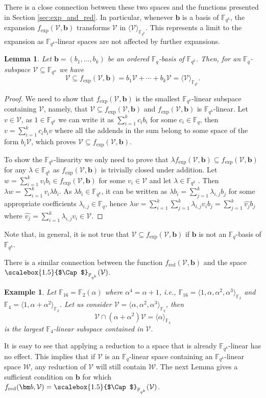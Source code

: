 \documentclass{article}
\newtheorem{lemma}{Lemma}
\newtheorem{example}{Example}
\newcommand{\F}{\mathbb{F}}
\newcommand{\Fq}{\mathbb{F}_{q}}
\newcommand{\Fqn}{\mathbb{F}_{q^n}}
\newcommand{\Fqk}{\mathbb{F}_{q^k}}
\newcommand{\calW}{\mathcal{W}}
\newcommand{\calV}{\mathcal{V}}
\newcommand{\fred}{f_{\mathrm{red}}}
\newcommand{\fexp}{f_{\mathrm{exp}}}
\newcommand{\Span}[2]{\langle #2 \rangle_{#1}}
\newcommand{\Core}[1]{\mathop{\scalebox{1.5}{$\Cap$}}\nolimits_{\mathbb{F}_{q^k}}(#1)}
\begin{document}
There is a close connection between these two spaces and the functions presented in Section \ref{sec:exp_and_red}.
In particular, whenever $\bm b$ is a basis of $\Fqk$,
the expansion $\fexp(\calV, \bm b)$ transforms $\calV$ in $\Span{\Fqk}{\calV}$. This represents a limit to the expansion as $\Fqk$-linear spaces are not affected by further expansions. 
\begin{lemma}
\label{lm:exp_to_Fqk_linear}
    Let $\bm b = (b_1,\ldots, b_k)$ be an ordered $\Fq$-basis of  $\Fqk$. Then, for an $\Fq$-subspace $\calV\subseteq\Fqn$ we have 
    \[
    \calV\subseteq \fexp(\calV, \bm b) = b_1 \calV + \cdots + b_k \calV = \Span{\Fqk}{\calV}.
    \]
\end{lemma}
\begin{proof}
    We need to show that $\fexp(\calV, \bm b)$ is the smallest $\Fqk$-linear subspace containing $\calV$, namely, that $\calV \subseteq \fexp(\calV, \bm b)$ and $\fexp(\calV, \bm b)$ is $\Fqk$-linear. Let $v \in \calV$, as $1 \in \Fqk$ we can write it as $\sum_{i=1}^k c_i b_i$ for some $c_i \in \Fq$, then $v = \sum_{i=1}^k c_i b_i v$ where all the addends in the sum belong to some space of the form $b_i \calV$, which proves $\calV \subseteq \fexp(\calV, \bm b).$
    
    To show the $\Fqk$-linearity we only need to prove that $\lambda \fexp(\calV, \bm b) \subseteq \fexp(\calV, \bm b)$ for any $\lambda \in \Fqk$ as $\fexp(\calV, \bm b)$ is trivially closed under addition.
    Let $w = \sum_{i=1}^{k} v_i b_i \in \fexp(\calV, \bm b)$ for some $v_i \in \calV$ and let $\lambda \in \Fqk$ .
    Then $\lambda w = \sum_{i=1}^k  v_i \lambda b_i$. As $\lambda b_i \in \Fqk$, it can be written as $\lambda b_i = \sum_{j=1}^k \lambda_{i,j} b_j$ for some appropriate coefficients $\lambda_{i,j} \in \Fq$, hence $\lambda w = \sum_{i=1}^k \sum_{j=1}^k  \lambda_{i,j} v_i  b_j =  \sum_{j=1}^k  \hat{v_j}  b_j$ where $\hat{v_j} = \sum_{i=1}^k \lambda_{i,j} v_i \in \calV$.
\end{proof}
Note that, in general, it is not true that $\calV \subseteq \fexp(\calV, \bm b)$ if $\bm b$ is not an $\Fq$-basis of $\Fqk$.
\\
\par
There is a similar connection between the function $\fred(\calV,\bm b)$ and the space $\Core{\calV}$.


\begin{example}
    Let $\F_{16}=\F_{2}(\alpha)$ where $\alpha^4=\alpha+1$, i.e., $\mathbb{F}_{16}=\langle 1,\alpha,\alpha^2,\alpha^3\rangle_{\F_2}$ and $\F_4=\langle 1, \alpha+\alpha^2\rangle_{\F_2}$. Let us consider $\calV=\langle \alpha,\alpha^2,\alpha^3\rangle_{\F_2}$, then 
    \[
    \calV\cap(\alpha+\alpha^2) \calV= \langle \alpha\rangle_{\F_4}
    \]
    is the largest $\F_4$-linear subspace contained in $\calV$.
\end{example}
It is easy to see that applying a reduction to a space that is already $\Fqk$-linear has no effect.
This implies that if $\calV$ is an $\Fq$-linear space containing an $\Fqk$-linear space $\calW$, any reduction of $\calV$ will still contain $\calW$.
The next Lemma gives a sufficient condition on $\bm b$ for which $\fred(\bm b, \calV) = \Core{\calV}$.
\end{document}
